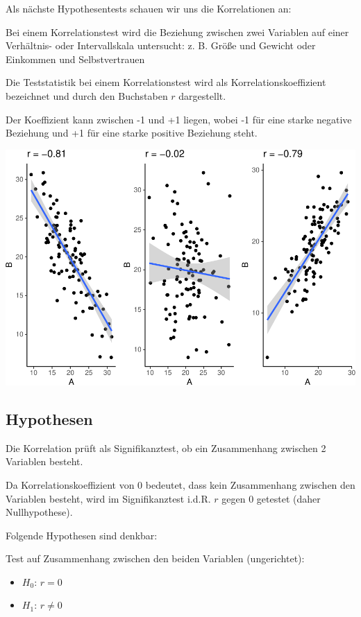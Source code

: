 \documentclass[
]{book}
\providecommand{\tightlist}{%
  \setlength{\itemsep}{0pt}\setlength{\parskip}{0pt}}
\begin{document}
Als nächste Hypothesentests schauen wir uns die Korrelationen an:

Bei einem Korrelationstest wird die Beziehung zwischen zwei Variablen auf einer Verhältnis- oder Intervallskala untersucht: z. B. Größe und Gewicht oder Einkommen und Selbstvertrauen

Die Teststatistik bei einem Korrelationstest wird als Korrelationskoeffizient bezeichnet und durch den Buchstaben \(r\) dargestellt.

Der Koeffizient kann zwischen -1 und +1 liegen, wobei -1 für eine starke negative Beziehung und +1 für eine starke positive Beziehung steht.

\includegraphics{CFH_R_bookdown_files/figure-latex/unnamed-chunk-112-1.pdf}

\hypertarget{hypothesen}{%
\subsection{Hypothesen}\label{hypothesen}}

Die Korrelation prüft als Signifikanztest, ob ein Zusammenhang zwischen 2 Variablen besteht.

Da Korrelationskoeffizient von 0 bedeutet, dass kein Zusammenhang zwischen den Variablen besteht, wird im Signifikanztest i.d.R. \(r\) gegen 0 getestet (daher Nullhypothese).

Folgende Hypothesen sind denkbar:

Test auf Zusammenhang zwischen den beiden Variablen (ungerichtet):

\begin{itemize}
\tightlist
\item
  \(H_0\): \(r = 0\)
\item
  \(H_1\): \(r \neq 0\)
\end{itemize}
\end{document}
